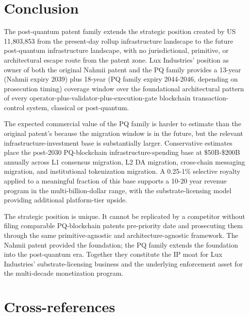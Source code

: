 \documentclass[11pt,letterpaper]{article}
\begin{document}
\section{Conclusion}

The post-quantum patent family extends the strategic position created by US 11,803,853 from the present-day rollup infrastructure landscape to the future post-quantum infrastructure landscape, with no jurisdictional, primitive, or architectural escape route from the patent zone. Lux Industries' position as owner of both the original Nahmii patent and the PQ family provides a 13-year (Nahmii expiry 2039) plus 18-year (PQ family expiry 2044-2046, depending on prosecution timing) coverage window over the foundational architectural pattern of every operator-plus-validator-plus-execution-gate blockchain transaction-control system, classical or post-quantum.

The expected commercial value of the PQ family is harder to estimate than the original patent's because the migration window is in the future, but the relevant infrastructure-investment base is substantially larger. Conservative estimates place the post-2030 PQ-blockchain infrastructure-spending base at \$50B-\$200B annually across L1 consensus migration, L2 DA migration, cross-chain messaging migration, and institutional tokenization migration. A 0.25-1\% selective royalty applied to a meaningful fraction of this base supports a 10-20 year revenue program in the multi-billion-dollar range, with the substrate-licensing model providing additional platform-tier upside.

The strategic position is unique. It cannot be replicated by a competitor without filing comparable PQ-blockchain patents pre-priority date and prosecuting them through the same primitive-agnostic and architecture-agnostic framework. The Nahmii patent provided the foundation; the PQ family extends the foundation into the post-quantum era. Together they constitute the IP moat for Lux Industries' substrate-licensing business and the underlying enforcement asset for the multi-decade monetization program.

\section*{Cross-references}
\end{document}
